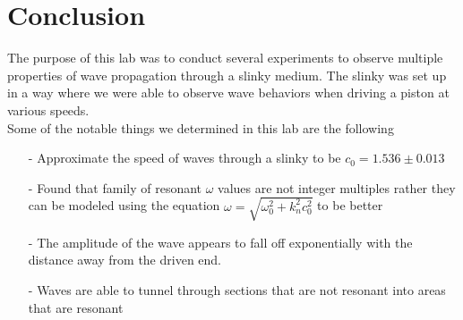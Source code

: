 \documentclass{article}
\begin{document}
\section{Conclusion}
The purpose of this lab was to conduct several experiments to observe multiple
properties of wave propagation through a slinky medium. The slinky was set up in
a way where we were able to observe wave behaviors when driving a piston at
various speeds.\\
Some of the notable things we determined in this lab are the following\
\begin{itemize}
    \item[-] Approximate the speed of waves through a slinky to be $c_0 = 1.536
    \pm 0.013$
    \item[-] Found that family of resonant $\omega$ values are not integer
    multiples rather they can be modeled using the equation
    $\omega = \sqrt{\omega_0^2 + k_n^2c_0^2}$ to be better
    \item[-]The amplitude of the wave appears to fall off exponentially with
    the distance away from the driven end.
    \item[-] Waves are able to tunnel through sections that are not resonant
    into areas that are resonant
\end{itemize}
\end{document}
